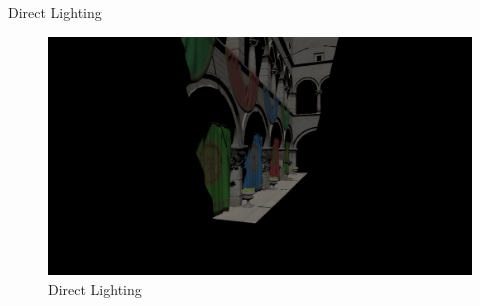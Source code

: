 \documentclass[10pt]{beamer}
\begin{document}
\begin{frame}{Direct Lighting}
  \begin{figure}
    \includegraphics[width=\textwidth]{debugDirect}
    \caption*{Direct Lighting}
  \end{figure}
\end{frame}
\end{document}
